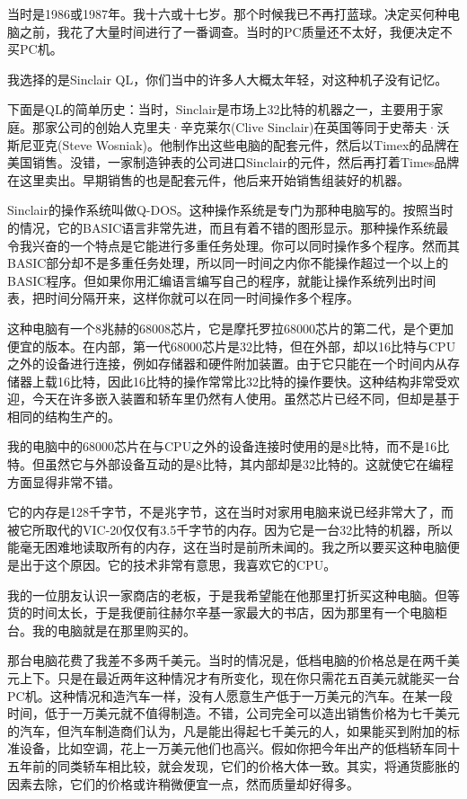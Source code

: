 当时是1986或1987年。我十六或十七岁。那个时候我已不再打蓝球。决定买何种电脑之前，我花了大量时间进行了一番调查。当时的PC质量还不太好，我便决定不买PC机。

我选择的是Sinclair QL，你们当中的许多人大概太年轻，对这种机子没有记忆。

下面是QL的简单历史：当时，Sinclair是市场上32比特的机器之一，主要用于家庭。那家公司的创始人克里夫·辛克莱尔(Clive Sinclair)在英国等同于史蒂夫·沃斯尼亚克(Steve Wosniak)。他制作出这些电脑的配套元件，然后以Timex的品牌在美国销售。没错，一家制造钟表的公司进口Sinclair的元件，然后再打着Times品牌在这里卖出。早期销售的也是配套元件，他后来开始销售组装好的机器。

Sinclair的操作系统叫做Q-DOS。这种操作系统是专门为那种电脑写的。按照当时的情况，它的BASIC语言非常先进，而且有着不错的图形显示。那种操作系统最令我兴奋的一个特点是它能进行多重任务处理。你可以同时操作多个程序。然而其BASIC部分却不是多重任务处理，所以同一时间之内你不能操作超过一个以上的BASIC程序。但如果你用汇编语言编写自己的程序，就能让操作系统列出时间表，把时间分隔开来，这样你就可以在同一时间操作多个程序。

这种电脑有一个8兆赫的68008芯片，它是摩托罗拉68000芯片的第二代，是个更加便宜的版本。在内部，第一代68000芯片是32比特，但在外部，却以16比特与CPU之外的设备进行连接，例如存储器和硬件附加装置。由于它只能在一个时间内从存储器上载16比特，因此16比特的操作常常比32比特的操作要快。这种结构非常受欢迎，今天在许多嵌入装置和轿车里仍然有人使用。虽然芯片已经不同，但却是基于相同的结构生产的。

我的电脑中的68000芯片在与CPU之外的设备连接时使用的是8比特，而不是16比特。但虽然它与外部设备互动的是8比特，其内部却是32比特的。这就使它在编程方面显得非常不错。

它的内存是128千字节，不是兆字节，这在当时对家用电脑来说已经非常大了，而被它所取代的VIC-20仅仅有3.5千字节的内存。因为它是一台32比特的机器，所以能毫无困难地读取所有的内存，这在当时是前所未闻的。我之所以要买这种电脑便是出于这个原因。它的技术非常有意思，我喜欢它的CPU。

我的一位朋友认识一家商店的老板，于是我希望能在他那里打折买这种电脑。但等货的时间太长，于是我便前往赫尔辛基一家最大的书店，因为那里有一个电脑柜台。我的电脑就是在那里购买的。

那台电脑花费了我差不多两千美元。当时的情况是，低档电脑的价格总是在两千美元上下。只是在最近两年这种情况才有所变化，现在你只需花五百美元就能买一台PC机。这种情况和造汽车一样，没有人愿意生产低于一万美元的汽车。在某一段时间，低于一万美元就不值得制造。不错，公司完全可以造出销售价格为七千美元的汽车，但汽车制造商们认为，凡是能出得起七千美元的人，如果能买到附加的标准设备，比如空调，花上一万美元他们也高兴。假如你把今年出产的低档轿车同十五年前的同类轿车相比较，就会发现，它们的价格大体一致。其实，将通货膨胀的因素去除，它们的价格或许稍微便宜一点，然而质量却好得多。

